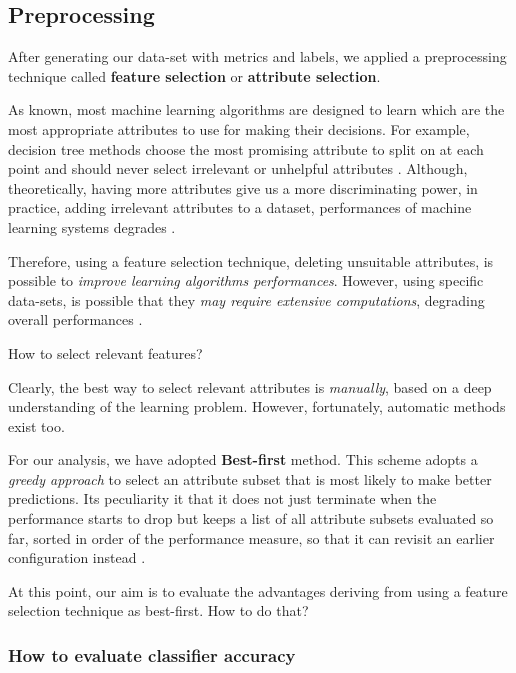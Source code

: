 \documentclass[sigconf]{acmart}
\begin{document}
\subsection{Preprocessing}

After generating our data-set with metrics and labels, we applied a preprocessing technique called \textbf{feature selection} or \textbf{attribute selection}.

As known, most machine learning algorithms are designed to learn which are the most appropriate attributes to use for making their decisions. For example, decision tree methods choose the most promising attribute to split on at each point and should never select irrelevant or unhelpful attributes \cite{FalessiDataMining}. Although, theoretically, having more attributes give us a more discriminating power, in practice, adding irrelevant attributes to a dataset, performances of machine learning systems degrades \cite{FalessiDataMining}. 

Therefore, using a feature selection technique, deleting unsuitable attributes, is possible to \textit{improve learning algorithms performances}. However, using specific data-sets, is possible that they \textit{may require extensive computations}, degrading overall performances \cite{FalessiDataMining}.

How to select relevant features?

Clearly, the best way to select relevant attributes is \textit{manually}, based on a deep understanding of the learning problem. However, fortunately, automatic methods exist too. 

For our analysis, we have adopted \textbf{Best-first} method. This scheme adopts a \textit{greedy approach} to select an attribute subset that is most likely to make better predictions. Its peculiarity it that it does not just terminate when the performance starts to drop but keeps a list of all attribute subsets evaluated so far, sorted in order of the performance measure, so that it can revisit an earlier configuration instead \cite{FalessiDataMining}. 

At this point, our aim is to evaluate the advantages deriving from using a feature selection technique as best-first. How to do that?

\subsubsection{How to evaluate classifier accuracy}
\hfill\\
\end{document}

